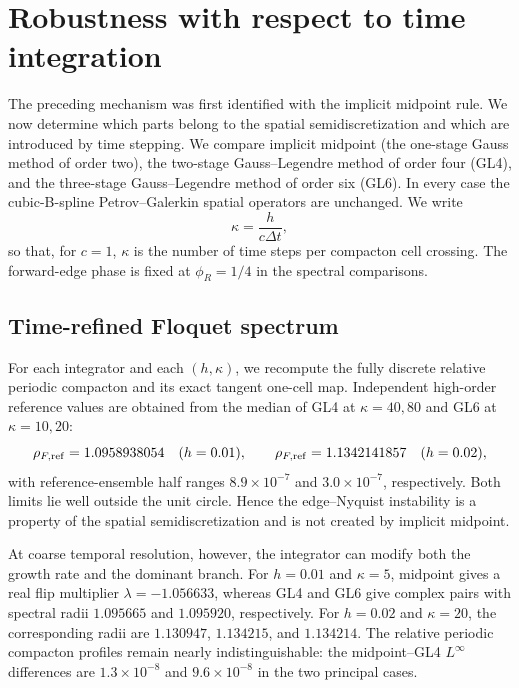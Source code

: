 \section{Robustness with respect to time integration}
\label{sec:time-integrators}

The preceding mechanism was first identified with the implicit midpoint rule.
We now determine which parts belong to the spatial semidiscretization and which
are introduced by time stepping.  We compare implicit midpoint (the one-stage
Gauss method of order two), the two-stage Gauss--Legendre method of order four
(GL4), and the three-stage Gauss--Legendre method of order six (GL6).  In every
case the cubic-B-spline Petrov--Galerkin spatial operators are unchanged.  We
write
\begin{equation}
 \kappa=\frac{h}{c\Delta t},
\end{equation}
so that, for $c=1$, $\kappa$ is the number of time steps per compacton cell
crossing.  The forward-edge phase is fixed at $\phi_R=1/4$ in the spectral
comparisons.

\subsection{Time-refined Floquet spectrum}

For each integrator and each $(h,\kappa)$, we recompute the fully discrete
relative periodic compacton and its exact tangent one-cell map.  Independent
high-order reference values are obtained from the median of GL4 at
$\kappa=40,80$ and GL6 at $\kappa=10,20$:
\begin{equation}
 \rho_{F,\rm ref}=1.0958938054\quad(h=0.01),
 \qquad
 \rho_{F,\rm ref}=1.1342141857\quad(h=0.02),
 \label{eq:rho-time-ref}
\end{equation}
with reference-ensemble half ranges $8.9\times10^{-7}$ and
$3.0\times10^{-7}$, respectively.  Both limits lie well outside the unit
circle.  Hence the edge--Nyquist instability is a property of the spatial
semidiscretization and is not created by implicit midpoint.

At coarse temporal resolution, however, the integrator can modify both the
growth rate and the dominant branch.  For $h=0.01$ and $\kappa=5$, midpoint
gives a real flip multiplier $\lambda=-1.056633$, whereas GL4 and GL6 give
complex pairs with spectral radii $1.095665$ and $1.095920$, respectively.
For $h=0.02$ and $\kappa=20$, the corresponding radii are $1.130947$,
$1.134215$, and $1.134214$.  The relative periodic compacton profiles remain
nearly indistinguishable: the midpoint--GL4 $L^\infty$ differences are
$1.3\times10^{-8}$ and $9.6\times10^{-8}$ in the two principal cases.

